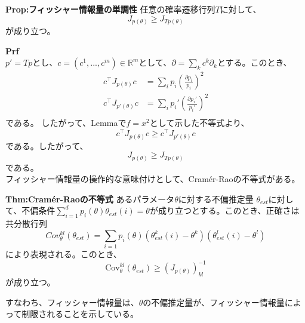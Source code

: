 \documentclass[a4paper,11pt]{jsarticle}
\numberwithin{equation}{section}
\begin{document}
\begin{itembox}[l]{\textbf{Prop:フィッシャー情報量の単調性}}
    任意の確率遷移行列$T$に対して、
    \begin{equation}
        J_{p(\theta)} \geq J_{Tp(\theta)}
    \end{equation}
    が成り立つ。
\end{itembox}
\textbf{Prf}\\
$p' = Tp$とし、$c=(c^1,...,c^m)\in \mathbb{R}^m$として、$\partial = \sum_k c^k \partial_k$とする。このとき、
\begin{align}
    c^{\top}J_{p(\theta)}c &= \sum_{i} p_i \left(\frac{\partial p_i}{p_i}\right)^2\\
    c^{\top}J_{p'(\theta)}c &= \sum_{i} p_i' \left(\frac{\partial p_i'}{p_i'}\right)^2\\
\end{align}
である。%
したがって、Lemmaで$f=x^2$として示した不等式より、
\begin{equation}
    c^{\top}J_{p(\theta)}c \geq c^{\top}J_{p'(\theta)}c
\end{equation}
である。したがって、
\begin{equation}
    J_{p(\theta)} \geq J_{Tp(\theta)}
\end{equation}
である。\hfill \qedsymbol\\
フィッシャー情報量の操作的な意味付けとして、Cramér-Raoの不等式がある。\\
\begin{itembox}[l]{\textbf{Thm:Cramér-Raoの不等式}}
    あるパラメータ$\theta$に対する不偏推定量 $\theta_{est}$に対して、不偏条件$\sum_{i=1}^{d}p_i(\theta)\theta_{est}(i) = \theta$が成り立つとする。このとき、正確さは共分散行列
    \begin{equation}
        Cov_{\theta}^{kl}(\theta_{est})=\sum_{i=1} p_i(\theta)(\theta_{est}^k(i)-\theta^k)(\theta_{est}^l(i)-\theta^l) 
    \end{equation}
    により表現される。このとき、
    \begin{equation}
        \text{Cov}_{\theta}^{kl}(\theta_{est}) \geq (J_{p(\theta)})^{-1}_{kl}
    \end{equation}
    が成り立つ。
\end{itembox}
すなわち、フィッシャー情報量は、$\theta$の不偏推定量が、フィッシャー情報量によって制限されることを示している。\\
\end{document}

